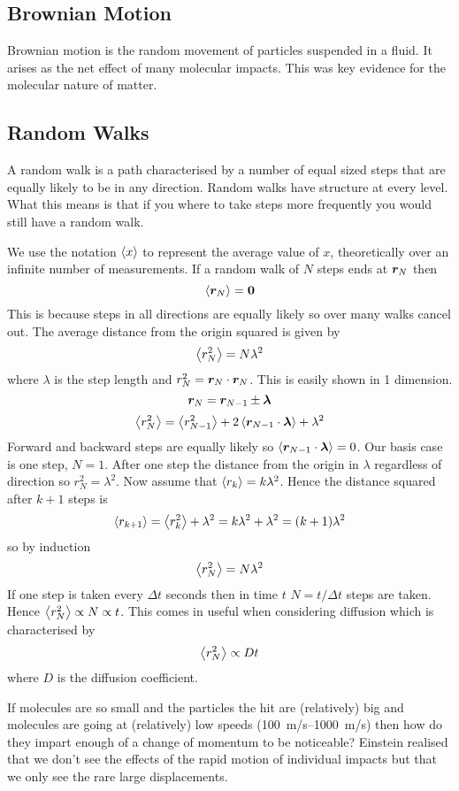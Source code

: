 \documentclass{article}
\begin{document}
    \subsection{Brownian Motion}
    Brownian motion is the random movement of particles suspended in a fluid.
    It arises as the net effect of many molecular impacts.
    This was key evidence for the molecular nature of matter.
    
    \subsection{Random Walks}
    A random walk is a path characterised by a number of equal sized steps that are equally likely to be in any direction.
    Random walks have structure at every level.
    What this means is that if you where to take steps more frequently you would still have a random walk.
    
    We use the notation \(\left\langle{x}\right\rangle\) to represent the average value of \(x\), theoretically over an infinite number of measurements.
    If a random walk of \(N\) steps ends at \(\bm{r}_N\) then
    \[\left\langle{\bm{r}_N}\right\rangle = \bm{0}\]
    This is because steps in all directions are equally likely so over many walks cancel out.
    The average distance from the origin squared is given by
    \[\left\langle{r_N^2}\right\rangle = N\lambda^2\]
    where \(\lambda\) is the step length and \(r_N^2 = \bm{r}_N\cdot\bm{r}_N\).
    This is easily shown in 1 dimension.
    \[\bm{r}_N = \bm{r}_{N-1} \pm \bm{\lambda}\]
    \[\left\langle{r_N^2}\right\rangle = \left\langle{r_{N-1}^2}\right\rangle + 2\left\langle{\bm{r}_{N-1}\cdot\bm{\lambda}}\right\rangle + \lambda^2\]
    Forward and backward steps are equally likely so \(\left\langle{\bm{r}_{N-1}\cdot\bm{\lambda}}\right\rangle = 0\).
    Our basis case is one step, \(N = 1\).
    After one step the distance from the origin in \(\lambda\) regardless of direction so \(r_N^2 = \lambda^2\).
    Now assume that \(\left\langle{r_k}\right\rangle = k\lambda^2\).
    Hence the distance squared after \(k+1\) steps is
    \[\left\langle{r_{k+1}}\right\rangle = \left\langle{r_k^2}\right\rangle + \lambda^2 = k\lambda^2 + \lambda^2 = (k+1)\lambda^2\]
    so by induction
    \[\left\langle{r_N^2}\right\rangle = N\lambda^2\]
    If one step is taken every \(\Delta t\) seconds then in time \(t\) \(N = t/\Delta t\) steps are taken.
    Hence \(\left\langle{r_N^2}\right\rangle\propto N \propto t\).
    This comes in useful when considering diffusion which is characterised by
    \[\left\langle{r_N^2}\right\rangle \propto Dt\]
    where \(D\) is the diffusion coefficient.
    
    If molecules are so small and the particles the hit are (relatively) big and molecules are going at (relatively) low speeds (\SIrange{100}{1000}{m/s}) then how do they impart enough of a change of momentum to be noticeable?
    Einstein realised that we don't see the effects of the rapid motion of individual impacts but that we only see the rare large displacements.
    
\end{document}
